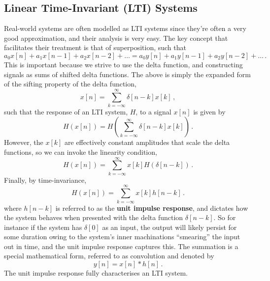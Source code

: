 \subsection{Linear Time-Invariant (LTI) Systems}
%
Real-world systems are often modelled as LTI systems since they're often a very good approximation,
and their analysis is very easy. The key concept that facilitates their treatment is that of
superposition, such that
%
\begin{equation}
  a_0x[n] + a_1x[n-1] + a_2x[n-2] + \hdots = a_0y[n] + a_1y[n-1] + a_2y[n-2] + \hdots \,.
\end{equation}
%
This is important because we strive to use the delta function, and constructing signals as
sums of shifted delta functions. The above is simply the expanded form of the sifting property
of the delta function,
%
\begin{displaymath}
  x[n] = \sum_{k=-\infty}^\infty \delta[n-k]x[k] \,,
\end{displaymath}
%
such that the response of an LTI system, $H$, to a signal $x[n]$ is given by
%
\begin{equation}
  H(x[n]) = H\left( \sum_{k=-\infty}^\infty \delta[n-k]x[k] \right) \,.
\end{equation}
%
However, the $x[k]$ are effectively constant amplitudes that scale the delta functions,
so we can invoke the linearity condition,
%
\begin{equation}
  H(x[n]) = \sum_{k=-\infty}^\infty x[k] H(\delta[n-k]) \,.
\end{equation}
%
Finally, by time-invariance,
%
\begin{equation}
  H(x[n]) = \sum_{k=-\infty}^\infty x[k] h[n-k] \,.
\end{equation}
%
where $h[n-k]$ is referred to as the \textbf{unit impulse response}, and dictates how
the system behaves when presented with the delta function $\delta[n-k]$. So for
instance if the system has $\delta[0]$ as an input, the output will likely persist
for some duration owing to the system's inner machinations ``smearing'' the input out
in time, and the unit impulse response captures this.
The summation is a special mathematical form, referred to as convolution and denoted by
%
\begin{equation}
  y[n] = x[n] * h[n] \,.
\end{equation}
%
The unit impulse response fully characterises an LTI system.
